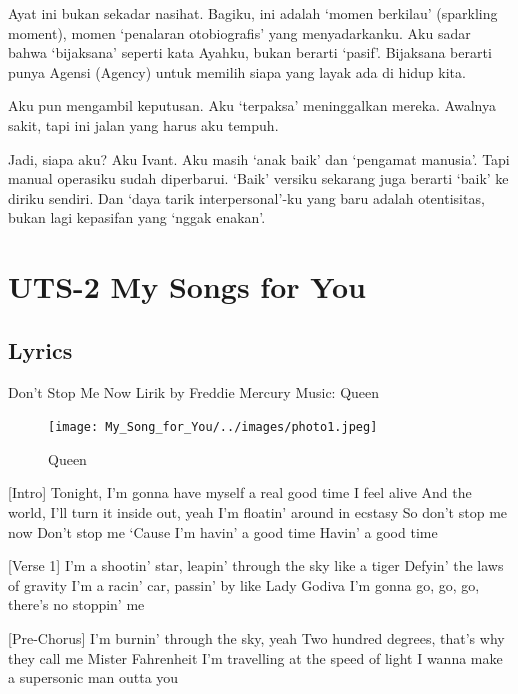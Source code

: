 \documentclass[
  letterpaper,
  DIV=11,
  numbers=noendperiod]{scrreprt}
\begin{document}
Ayat ini bukan sekadar nasihat. Bagiku, ini adalah `momen berkilau'
(sparkling moment), momen `penalaran otobiografis' yang menyadarkanku.
Aku sadar bahwa `bijaksana' seperti kata Ayahku, bukan berarti `pasif'.
Bijaksana berarti punya Agensi (Agency) untuk memilih siapa yang layak
ada di hidup kita.

Aku pun mengambil keputusan. Aku `terpaksa' meninggalkan mereka. Awalnya
sakit, tapi ini jalan yang harus aku tempuh.

Jadi, siapa aku? Aku Ivant. Aku masih `anak baik' dan `pengamat
manusia'. Tapi manual operasiku sudah diperbarui. `Baik' versiku
sekarang juga berarti `baik' ke diriku sendiri. Dan `daya tarik
interpersonal'-ku yang baru adalah otentisitas, bukan lagi kepasifan
yang `nggak enakan'.


\chapter{UTS-2 My Songs for You}\label{uts-2-my-songs-for-you}

\section{Lyrics}\label{lyrics}

Don't Stop Me Now Lirik by Freddie Mercury Music: Queen

\begin{figure}[H]

{\centering \texttt{[image: My\_Song\_for\_You/../images/photo1.jpeg]}

}

\caption{Queen}

\end{figure}%

{[}Intro{]} Tonight, I'm gonna have myself a real good time I feel alive
And the world, I'll turn it inside out, yeah I'm floatin' around in
ecstasy So don't stop me now Don't stop me `Cause I'm havin' a good time
Havin' a good time

{[}Verse 1{]} I'm a shootin' star, leapin' through the sky like a tiger
Defyin' the laws of gravity I'm a racin' car, passin' by like Lady
Godiva I'm gonna go, go, go, there's no stoppin' me

{[}Pre-Chorus{]} I'm burnin' through the sky, yeah Two hundred degrees,
that's why they call me Mister Fahrenheit I'm travelling at the speed of
light I wanna make a supersonic man outta you
\end{document}
